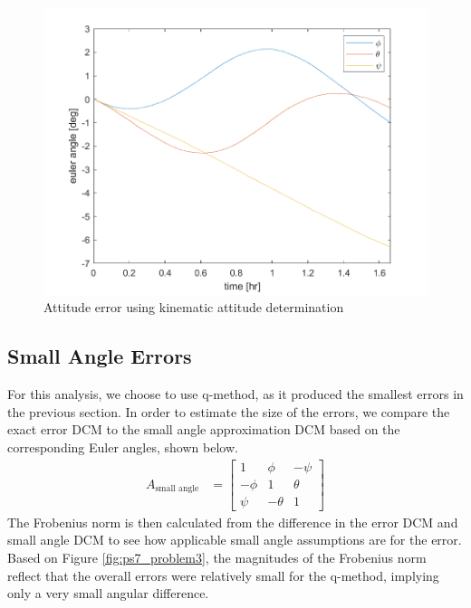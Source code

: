 \begin{figure}[H]
\centering
\includegraphics[scale=0.6]{Images/ps7_problem2_kin.png}
\caption{Attitude error using kinematic attitude determination}
\label{fig:ps7_problem2_kin}
\end{figure}

\subsection{Small Angle Errors}
For this analysis, we choose to use q-method, as it produced the smallest errors in the previous section. In order to estimate the size of the errors, we compare the exact error DCM to the small angle approximation DCM based on the corresponding Euler angles, shown below.
\begin{align*}
    A_{\text{small angle}} &= 
    \begin{bmatrix}
        1 & \phi & -\psi \\
        -\phi & 1 & \theta \\
        \psi & -\theta & 1
    \end{bmatrix}
\end{align*}
The Frobenius norm is then calculated from the difference in the error DCM and small angle DCM to see how applicable small angle assumptions are for the error. Based on Figure \ref{fig:ps7_problem3}, the magnitudes of the Frobenius norm reflect that the overall errors were relatively small for the q-method, implying only a very small angular difference.

